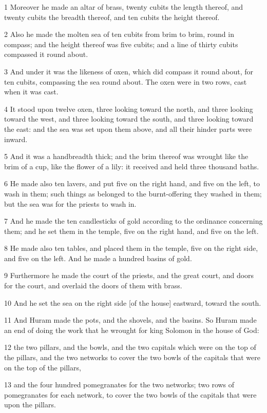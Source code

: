 \par 1 Moreover he made an altar of brass, twenty cubits the length thereof, and twenty cubits the breadth thereof, and ten cubits the height thereof.
\par 2 Also he made the molten sea of ten cubits from brim to brim, round in compass; and the height thereof was five cubits; and a line of thirty cubits compassed it round about.
\par 3 And under it was the likeness of oxen, which did compass it round about, for ten cubits, compassing the sea round about. The oxen were in two rows, cast when it was cast.
\par 4 It stood upon twelve oxen, three looking toward the north, and three looking toward the west, and three looking toward the south, and three looking toward the east: and the sea was set upon them above, and all their hinder parts were inward.
\par 5 And it was a handbreadth thick; and the brim thereof was wrought like the brim of a cup, like the flower of a lily: it received and held three thousand baths.
\par 6 He made also ten lavers, and put five on the right hand, and five on the left, to wash in them; such things as belonged to the burnt-offering they washed in them; but the sea was for the priests to wash in.
\par 7 And he made the ten candlesticks of gold according to the ordinance concerning them; and he set them in the temple, five on the right hand, and five on the left.
\par 8 He made also ten tables, and placed them in the temple, five on the right side, and five on the left. And he made a hundred basins of gold.
\par 9 Furthermore he made the court of the priests, and the great court, and doors for the court, and overlaid the doors of them with brass.
\par 10 And he set the sea on the right side [of the house] eastward, toward the south.
\par 11 And Huram made the pots, and the shovels, and the basins. So Huram made an end of doing the work that he wrought for king Solomon in the house of God:
\par 12 the two pillars, and the bowls, and the two capitals which were on the top of the pillars, and the two networks to cover the two bowls of the capitals that were on the top of the pillars,
\par 13 and the four hundred pomegranates for the two networks; two rows of pomegranates for each network, to cover the two bowls of the capitals that were upon the pillars.
